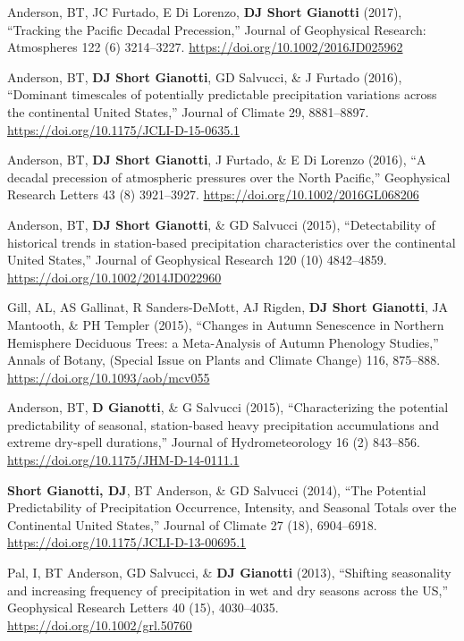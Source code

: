 \documentclass[10pt, a4paper]{article}
\newcommand{\lbr}{\vspace*{12pt}}
\newcommand{\years}[1]{\mbox{}\marginnote{\scriptsize #1}} %
\begin{document}
\years{2017a}Anderson, BT, JC Furtado, E Di Lorenzo, \textbf{DJ Short Gianotti} (2017), ``Tracking the Pacific Decadal Precession,'' Journal of Geophysical Research: Atmospheres 122 (6) 3214--3227. \url{https://doi.org/10.1002/2016JD025962} \lbr

\years{2016b}Anderson, BT, \textbf{DJ Short Gianotti}, GD Salvucci, \& J Furtado (2016), ``Dominant timescales of potentially predictable precipitation variations across the continental United States,'' Journal of Climate 29, 8881--8897. \url{https://doi.org/10.1175/JCLI-D-15-0635.1} \lbr

\years{2016a}Anderson, BT, \textbf{DJ Short Gianotti}, J Furtado, \& E Di Lorenzo (2016), ``A decadal precession of atmospheric pressures over the North Pacific,'' Geophysical Research Letters 43 (8) 3921--3927. \url{https://doi.org/10.1002/2016GL068206} \lbr

\years{2015c}Anderson, BT, \textbf{DJ Short Gianotti}, \& GD Salvucci (2015), ``Detectability of historical trends in station-based precipitation characteristics over the continental United States,'' Journal of Geophysical Research 120 (10) 4842--4859. \url{https://doi.org/10.1002/2014JD022960} \lbr

\years{2015b}Gill, AL, AS Gallinat, R Sanders-DeMott, AJ Rigden, \textbf{DJ Short Gianotti}, JA Mantooth, \& PH Templer (2015), ``Changes in Autumn Senescence in Northern Hemisphere Deciduous Trees: a Meta-Analysis of Autumn Phenology Studies,'' Annals of Botany, (Special Issue on Plants and Climate Change) 116, 875--888. \url{https://doi.org/10.1093/aob/mcv055} \lbr

\years{2015a}Anderson, BT, \textbf{D Gianotti}, \& G Salvucci (2015), ``Characterizing the potential predictability of seasonal, station-based heavy precipitation accumulations and extreme dry-spell durations,'' Journal of Hydrometeorology 16 (2) 843--856. \url{https://doi.org/10.1175/JHM-D-14-0111.1} \lbr

\years{2014a}\textbf{Short Gianotti, DJ}, BT Anderson, \& GD Salvucci (2014), ``The Potential Predictability of Precipitation Occurrence, Intensity, and Seasonal Totals over the Continental United States,'' Journal of Climate 27 (18), 6904--6918. \url{https://doi.org/10.1175/JCLI-D-13-00695.1} \lbr

\years{2013b}Pal, I, BT Anderson, GD Salvucci, \& \textbf{DJ Gianotti} (2013), ``Shifting seasonality and increasing frequency of precipitation in wet and dry seasons across the US,'' Geophysical Research Letters 40 (15), 4030--4035. \url{https://doi.org/10.1002/grl.50760} \lbr
\end{document}
